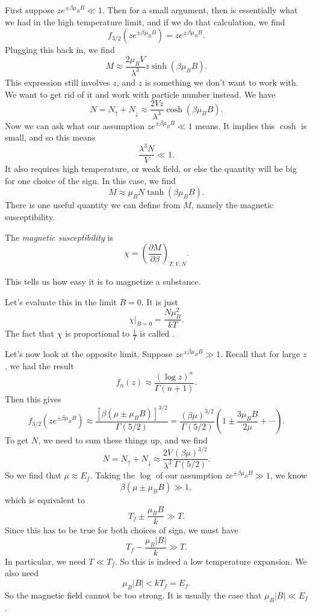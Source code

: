 \documentclass[a4paper]{article}
\begin{document}
First suppose $ze^{\pm \beta \mu_BB} \ll 1$. Then for a small argument, then is essentially what we had in the high temperature limit, and if we do that calculation, we find
\[
  f_{3/2}(z e^{\pm \beta\mu_BB}) = z e^{\pm \beta\mu_BB}.
\]
Plugging this back in, we find
\[
  M \approx \frac{2 \mu_B V}{\lambda^3} z \sinh (\beta \mu_B B).
\]
This expression still involves $z$, and $z$ is something we don't want to work with. We want to get rid of it and work with particle number instead. We have
\[
  N = N_\uparrow + N_\downarrow \approx \frac{2 V z}{\lambda^3} \cosh (\beta \mu_BB).
\]
Now we can ask what our assumption $z e^{\pm \beta \mu_BB} \ll 1$ means. It implies this $\cosh$ is small, and so this means
\[
  \frac{\lambda^3 N}{V} \ll 1.
\]
It also requires high temperature, or weak field, or else the quantity will be big for one choice of the sign. In this case, we find
\[
  M \approx \mu_B N \tanh (\beta \mu_B B).
\]
There is one useful quantity we can define from $M$, namely the magnetic susceptibility.
\begin{defi}
  The \emph{magnetic susceptibility} is
  \[
    \chi = \left(\frac{\partial M}{\partial \beta}\right)_{T, V, N}.
  \]
\end{defi}
This tells us how easy it is to magnetize a substance.

Let's evaluate this in the limit $B = 0$. It is just
\[
  \chi|_{B = 0} = \frac{N \mu_B^2}{kT}.
\]
The fact that $\chi$ is proportional to $\frac{1}{T}$ is called .

Let's now look at the opposite limit. Suppose $z e^{\pm \beta \mu_B B} \gg 1$. Recall that for large $z$, we had the result
\[
  f_n(z) \approx \frac{(\log z)^n}{\Gamma(n + 1)}.
\]
Then this gives
\[
  f_{3/2} (ze^{\pm \beta \mu_BB}) \approx \frac{[\beta(\mu \pm \mu_BB)]^{3/2}}{\Gamma(5/2)} = \frac{(\beta \mu)^{3/2}}{\Gamma(5/2)} \left( 1 \pm \frac{3 \mu_BB}{2\mu} + \cdots\right).
\]
To get $N$, we need to sum these things up, and we find
\[
  N = N_{\uparrow} + N_{\downarrow} \approx \frac{2V}{\lambda^3} \frac{(\beta \mu)^{3/2}}{\Gamma(5/2)}.
\]
So we find that $\mu \approx E_f$. Taking the $\log$ of our assumption $ze^{\pm \beta\mu_BB} \gg 1$, we know
\[
  \beta(\mu \pm \mu_BB) \gg 1,
\]
which is equivalent to
\[
  T_f \pm \frac{\mu_BB}{k} \gg T.
\]
Since this has to be true for both choices of sign, we must have
\[
  T_f - \frac{\mu_B|B|}{k} \gg T.
\]
In particular, we need $T \ll T_f$. So this is indeed a low temperature expansion. We also need
\[
  \mu_B|B| < k T_f = E_f.
\]
So the magnetic field cannot be too strong. It is usually the case that $\mu_B|B| \ll E_f$.
\end{document}

